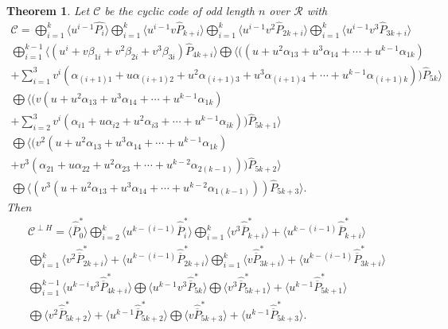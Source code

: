 \documentclass{amsart}
\newtheorem{theorem}{Theorem}[section]
\theoremstyle{definition}
\theoremstyle{remark}
\numberwithin{equation}{section}
\begin{document}
\begin{theorem} \label{th7}
    Let $\mathcal{C}$ be the cyclic code of odd length $n$ over $\mathcal{R}$ with
    \allowdisplaybreaks \begin{gather*}
		\mathcal{C}= \bigoplus_{i=1}^{k}\langle u^{i-1}\hat{P_{i}}\rangle \bigoplus_{i=1}^{k}\langle u^{i-1}v\hat{P}_{k+i}\rangle \bigoplus_{i=1}^{k}\langle u^{i-1}v^2\hat{P}_{2k+i}\rangle  \bigoplus_{i=1}^{k}\langle u^{i-1}v^3\hat{P}_{3k+i}\rangle \\
        \bigoplus_{i=1}^{k-1} \langle (u^i+ v\beta_{1i} + v^2\beta_{2i} + v^3\beta_{3i})\hat{P}_{4k+i}\rangle   \bigoplus \langle ((u + u^2\alpha_{13} + u^3\alpha_{14} + \cdots + u^{k-1}\alpha_{1k}) \\
      + \sum_{i=1}^{3} v^i( \alpha_{(i+1)1} + u\alpha_{(i+1)2} + u^2\alpha_{(i+1)3} + u^3\alpha_{(i+1)4} + \cdots + u^{k-1}\alpha_{(i+1)k} ))\hat{P}_{5k}\rangle
     \\  \bigoplus  \langle (v(u + u^2\alpha_{13} + u^3\alpha_{14} + \cdots + u^{k-1}\alpha_{1k})  \\+ \sum_{i=2}^{3} v^i( \alpha_{i1} + u\alpha_{i2} + u^2\alpha_{i3} + \cdots + u^{k-1}\alpha_{ik} ))\hat{P}_{5k+1} \rangle
     \\  \bigoplus  \langle (v^2(u + u^2\alpha_{13} + u^3\alpha_{14} + \cdots + u^{k-1}\alpha_{1k})
    \\ + v^3( \alpha_{21} + u\alpha_{22} + u^2\alpha_{23} + \cdots + u^{k-2}\alpha_{2(k-1)}))\hat{P}_{5k+2}\rangle
     \\  \bigoplus \langle (v^3(u + u^2\alpha_{13} + u^3\alpha_{14} + \cdots + u^{k-2}\alpha_{1(k-1)}))\hat{P}_{5k+3}\rangle.
		\end{gather*}
  Then
  \begin{gather*}
    \mathcal{C}^{\perp H} = \langle\hat{\overline{P}}_{0}^*\rangle \bigoplus_{i=2}^{k}\langle u^{k-(i-1)}\hat{\overline{P}}_{i}^*\rangle \bigoplus_{i=1}^{k} \langle v^3 \hat{\overline{{P}}}_{k+i}^* \rangle + \langle u^{k-(i-1)} \hat{\overline{{P}}}_{k+i}^* \rangle\\ \bigoplus_{i=1}^{k} \langle v^2 \hat{\overline{{P}}}_{2k+i}^* \rangle + \langle u^{k-(i-1)} \hat{\overline{{P}}}_{2k+i}^* \rangle  \bigoplus_{i=1}^{k} \langle v \hat{\overline{{P}}}_{3k+i}^* \rangle + \langle u^{k-(i-1)} \hat{\overline{{P}}}_{3k+i}^* \rangle \\\bigoplus_{i=1}^{k-1} \langle u^{k-i}v^3 \hat{\overline{{P}}}_{4k+i}^* \rangle  \bigoplus \langle u^{k-1}v^3 \hat{\overline{{P}}}_{5k}^* \rangle \bigoplus \langle v^3 \hat{\overline{{P}}}_{5k+1}^* \rangle + \langle u^{k-1} \hat{\overline{{P}}}_{5k+1}^* \rangle \\   \bigoplus \langle v^2 \hat{\overline{{P}}}_{5k+2}^* \rangle + \langle u^{k-1} \hat{\overline{{P}}}_{5k+2}^* \rangle \bigoplus \langle v \hat{\overline{{P}}}_{5k+3}^* \rangle + \langle u^{k-1} \hat{\overline{{P}}}_{5k+3}^* \rangle.

\end{gather*}
\end{theorem}
\end{document}
